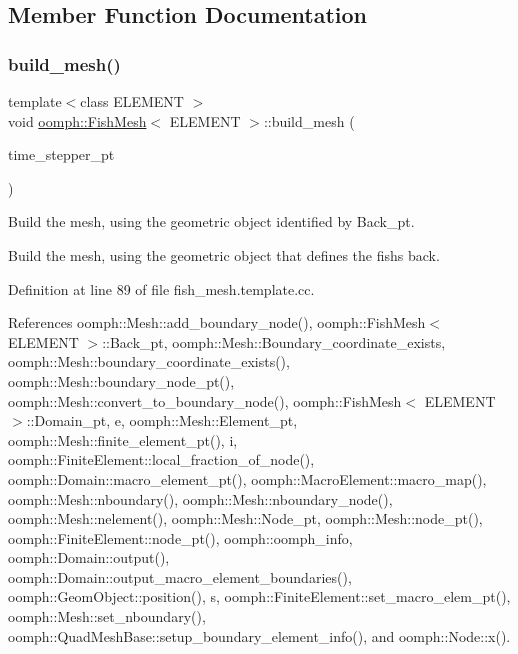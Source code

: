 \subsection{Member Function Documentation}
\mbox{\label{classoomph_1_1FishMesh_aabde81364817d938f0924997bf4f63cc}} 
\subsubsection{\texorpdfstring{build\+\_\+mesh()}{build\_mesh()}}
{\footnotesize\ttfamily template$<$class E\+L\+E\+M\+E\+NT $>$ \\
void \hyperlink{classoomph_1_1FishMesh}{oomph\+::\+Fish\+Mesh}$<$ E\+L\+E\+M\+E\+NT $>$\+::build\+\_\+mesh (\begin{DoxyParamCaption}\item[{\hyperlink{classoomph_1_1TimeStepper}{Time\+Stepper} $\ast$}]{time\+\_\+stepper\+\_\+pt }\end{DoxyParamCaption})\hspace{0.3cm}{\ttfamily [protected]}}



Build the mesh, using the geometric object identified by Back\+\_\+pt. 

Build the mesh, using the geometric object that defines the fish\textquotesingle{}s back. 

Definition at line 89 of file fish\+\_\+mesh.\+template.\+cc.



References oomph\+::\+Mesh\+::add\+\_\+boundary\+\_\+node(), oomph\+::\+Fish\+Mesh$<$ E\+L\+E\+M\+E\+N\+T $>$\+::\+Back\+\_\+pt, oomph\+::\+Mesh\+::\+Boundary\+\_\+coordinate\+\_\+exists, oomph\+::\+Mesh\+::boundary\+\_\+coordinate\+\_\+exists(), oomph\+::\+Mesh\+::boundary\+\_\+node\+\_\+pt(), oomph\+::\+Mesh\+::convert\+\_\+to\+\_\+boundary\+\_\+node(), oomph\+::\+Fish\+Mesh$<$ E\+L\+E\+M\+E\+N\+T $>$\+::\+Domain\+\_\+pt, e, oomph\+::\+Mesh\+::\+Element\+\_\+pt, oomph\+::\+Mesh\+::finite\+\_\+element\+\_\+pt(), i, oomph\+::\+Finite\+Element\+::local\+\_\+fraction\+\_\+of\+\_\+node(), oomph\+::\+Domain\+::macro\+\_\+element\+\_\+pt(), oomph\+::\+Macro\+Element\+::macro\+\_\+map(), oomph\+::\+Mesh\+::nboundary(), oomph\+::\+Mesh\+::nboundary\+\_\+node(), oomph\+::\+Mesh\+::nelement(), oomph\+::\+Mesh\+::\+Node\+\_\+pt, oomph\+::\+Mesh\+::node\+\_\+pt(), oomph\+::\+Finite\+Element\+::node\+\_\+pt(), oomph\+::oomph\+\_\+info, oomph\+::\+Domain\+::output(), oomph\+::\+Domain\+::output\+\_\+macro\+\_\+element\+\_\+boundaries(), oomph\+::\+Geom\+Object\+::position(), s, oomph\+::\+Finite\+Element\+::set\+\_\+macro\+\_\+elem\+\_\+pt(), oomph\+::\+Mesh\+::set\+\_\+nboundary(), oomph\+::\+Quad\+Mesh\+Base\+::setup\+\_\+boundary\+\_\+element\+\_\+info(), and oomph\+::\+Node\+::x().




